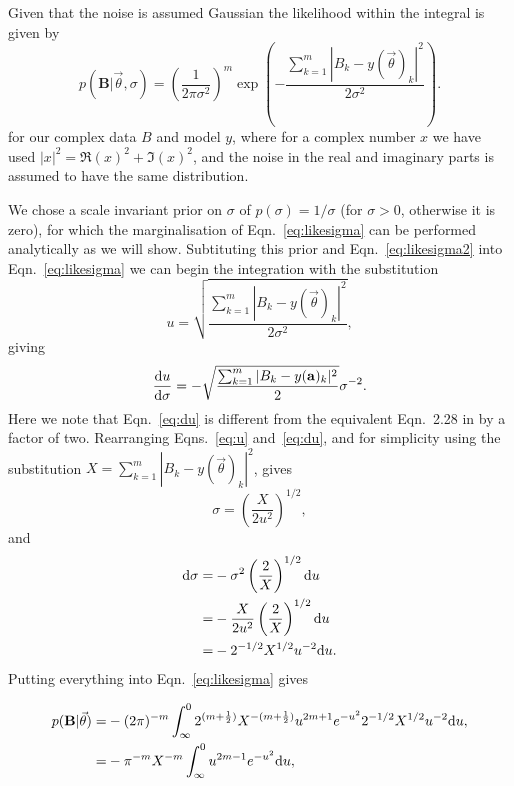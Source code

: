 \documentclass[aps,prd,showpacs,superscriptaddress,twocolumn,preprintnumbers,altaffilletter]{revtex4-1}
\begin{document}
Given that the noise is assumed Gaussian the likelihood within the integral is given by
\begin{equation}\label{eq:likesigma2}
p(\mathbf{B}|\vec{\theta},\sigma) = \left(\frac{1}{2\pi\sigma^2}\right)^{m}
\exp{\left( -\frac{\sum_{k=1}^m|B_k-y(\vec{\theta})_k|^2}{2\sigma^2} \right)}.
\end{equation}
for our complex data $B$ and model $y$, where for a complex number $x$ we have used $|x|^2 =
\Re{(x)}^2+\Im{(x)}^2$, and the noise in the real and imaginary parts is assumed to have the same
distribution.

We chose a scale invariant prior on $\sigma$ of $p(\sigma) = 1/\sigma$ (for $\sigma > 0$, otherwise it is
zero), for which the marginalisation of Eqn.~\ref{eq:likesigma} can be performed analytically as we will show.
Subtituting this prior and Eqn.~\ref{eq:likesigma2} into Eqn.~\ref{eq:likesigma} we can begin the
integration with the substitution
\begin{equation}\label{eq:u}
u = \sqrt{\frac{\sum_{k=1}^m|B_k-y(\vec{\theta})_k|^2}{2\sigma^2}},
\end{equation}
giving
\begin{equation}\label{eq:du}
\frac{{\rm d}u}{{\rm d}\sigma} = -\sqrt{\frac{\sum_{k=1}^m|B_k-y(\mathbf{a})_k|^2}{2}}\sigma^{-2}.
\end{equation}
Here we note that Eqn.~\ref{eq:du} is different from the equivalent Eqn.~2.28 in \cite{Dupuisthesis} by a
factor of two. Rearranging Eqns.~\ref{eq:u} and~\ref{eq:du}, and for simplicity using the substitution $X =
\sum_{k=1}^m |B_k-y(\vec{\theta})_k|^2$, gives
\begin{equation}
\sigma = \left(\frac{X}{2u^2}\right)^{1/2},
\end{equation}
and
\begin{align}
{\rm d}\sigma = & -\sigma^2 \left(\frac{2}{X}\right)^{1/2} {\rm d}u
\nonumber \\
 = & -\frac{X}{2u^2} \left(\frac{2}{X}\right)^{1/2} {\rm d}u \nonumber \\
 = & - 2^{-1/2} X^{1/2} u^{-2} {\rm d}u.
\end{align}
Putting everything into Eqn.~\ref{eq:likesigma} gives
\begin{widetext}
\begin{align}\label{eq:integral1}
p(\mathbf{B}|\vec{\theta})= & -(2\pi)^{-m} \int_{\infty}^0 2^{(m+\frac{1}{2})}
X^{-(m+\frac{1}{2})} u^{2m+1} e^{-u^2} 2^{-1/2} X^{1/2} u^{-2} {\rm d}u, \nonumber \\
 = & -\pi^{-m} X^{-m} \int_{\infty}^0 u^{2m-1} e^{-u^2} {\rm d}u,
\end{align}
\end{widetext}
\end{document}
